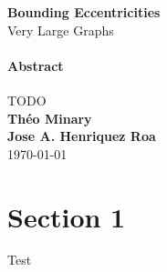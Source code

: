 \documentclass[11pt]{article}
\begin{document}
\begin{titlepage}
  \begin{center}
    \vspace*{1cm} \Huge \textbf{Bounding Eccentricities}\\
    \vspace*{1\baselineskip} Very Large Graphs\\
    \vspace*{2\baselineskip} \large
    \paragraph{Abstract}TODO\\
    \vfill \normalsize \textbf{Théo Minary}\\ \textbf{Jose
      A. Henriquez Roa}\\
    \vspace*{2\baselineskip} \today \rhead{\today}
    \newpage
    \normalsize \tableofcontents
    \newpage
  \end{center}
\end{titlepage}
\section{Section 1}
Test
\end{document}
